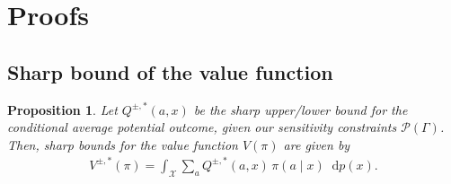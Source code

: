 \documentclass{article} %
\theoremstyle{plain}
\newtheorem{proposition}[theorem]{Proposition}
\theoremstyle{definition}
\theoremstyle{remark}
\newcommand*\diff{\mathop{}\!\mathrm{d}}
\begin{document}
\clearpage




\section{Proofs}\label{appendix:proofs}
\subsection{Sharp bound of the value function}\label{appendix:sharp_value}
\begin{proposition}%
    Let $Q^{\pm,*}(a,x)$ be the sharp upper/lower bound for the conditional average potential outcome, given our sensitivity constraints $\mathcal{P}(\Gamma)$. Then, sharp bounds for the value function $V(\pi)$ are given by
    \begin{align}
        V^{\pm,*}(\pi) = \int_\mathcal{X} \sum_a  Q^{\pm,*}(a,x) \, \pi(a\mid x) \diff p(x).
    \end{align}
\end{proposition}
\end{document}
